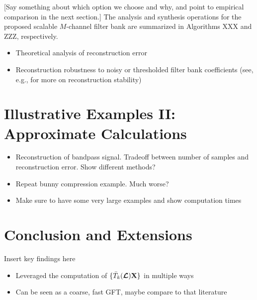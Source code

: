 \documentclass[journal, 10pt]{IEEEtran}
\begin{document}
{\color{red}
[Say something about which option we choose and why, and point to empirical comparison in the next section.]
The analysis and synthesis operations for the proposed scalable $M$-channel filter bank are summarized in Algorithms XXX and ZZZ, respectively.

\begin{itemize}
\item Theoretical analysis of reconstruction error
\item Reconstruction robustness to noisy or thresholded filter bank coefficients (see, e.g., \cite[Section III.B]{anis2016efficient} for more on reconstruction stability)
\end{itemize}
}

{\color{blue}
\section{Illustrative Examples II: Approximate Calculations} \label{Se:ill2}
\begin{itemize}
\item Reconstruction of bandpass signal. Tradeoff between number of samples and reconstruction error. Show different methods? 
\item Repeat bunny compression example. Much worse?
\item Make sure to have some very large examples and show computation times
\end{itemize}
}


\section{Conclusion and Extensions}
\label{Sec:ongoing}
{\color{red} %

Insert key findings here
\begin{itemize}
\item Leveraged the computation of $\{\bar{T}_k(\boldsymbol{\mathcal{L}}){\bf X}\}$ in multiple ways 
\item Can be seen as a coarse, fast GFT, maybe compare to that literature
\end{itemize}
}
\end{document}
